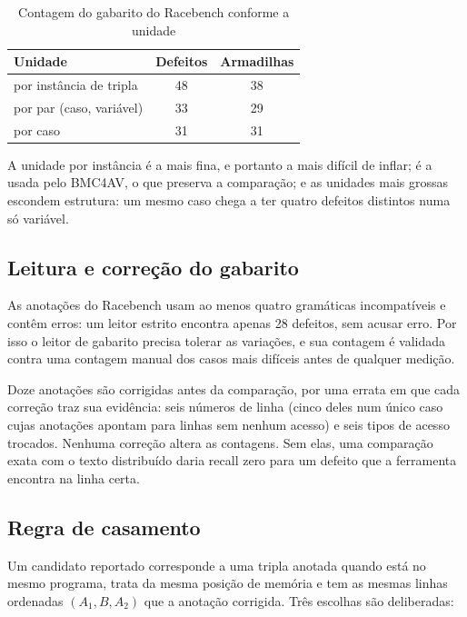 \begin{table}[htb]
  \centering
  \caption{Contagem do gabarito do Racebench conforme a unidade}
  \label{tab:unidades}
  \begin{tabular}{@{}lcc@{}}
    \toprule
    Unidade & Defeitos & Armadilhas \\
    \midrule
    por instância de tripla & 48 & 38 \\
    por par (caso, variável) & 33 & 29 \\
    por caso & 31 & 31 \\
    \bottomrule
  \end{tabular}
\end{table}

A unidade por instância é a mais fina, e portanto a mais difícil de inflar; é a
usada pelo BMC4AV, o que preserva a comparação; e as unidades mais grossas
escondem estrutura: um mesmo caso chega a ter quatro defeitos distintos
numa só variável.

\subsection{Leitura e correção do gabarito}

As anotações do Racebench usam ao menos quatro gramáticas incompatíveis e contêm
erros: um leitor estrito encontra apenas 28 defeitos, sem acusar erro. Por isso
o leitor de gabarito precisa tolerar as variações, e sua contagem é validada
contra uma contagem manual dos casos mais difíceis antes de qualquer medição.

Doze anotações são corrigidas antes da comparação, por uma errata em que cada
correção traz sua evidência: seis números de linha (cinco deles num único caso cujas anotações apontam para linhas sem nenhum acesso) e seis tipos de acesso trocados.
Nenhuma correção altera as contagens. Sem elas, uma comparação exata com o texto
distribuído daria recall zero para um defeito que a ferramenta encontra na linha
certa.

\subsection{Regra de casamento}

Um candidato reportado corresponde a uma tripla anotada quando está no
mesmo programa, trata da mesma posição de memória e tem as mesmas linhas
ordenadas $(A_1, B, A_2)$ que a anotação corrigida. Três escolhas são
deliberadas:


